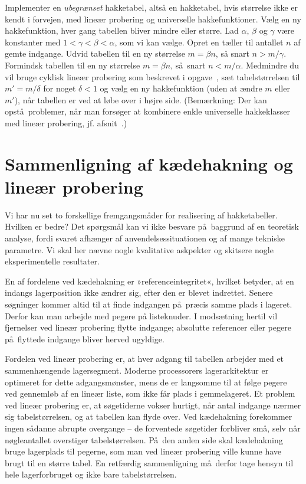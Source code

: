 \begin{exerc}
  Implementer en \emph{ubegrænset} hakketabel, altså en hakketabel, hvis størrelse ikke er kendt i forvejen, med lineær probering og universelle hakkefunktioner.
  Vælg en ny hakkefunktion, hver gang tabellen bliver mindre eller større.
  Lad $\alpha$, $\beta$ og $\gamma$ være konstanter med $1<\gamma<\beta<\alpha$, som vi kan vælge.
  Opret en tæller til antallet $n$ af gemte indgange.
  Udvid tabellen til en ny størrelse $m=\beta n$, så snart $n>m/\gamma$.
  Formindsk tabellen til en ny størrelse $m=\beta n$, så snart $n<m/\alpha$.
  Medmindre du vil bruge cyklisk lineær probering som beskrevet i opgave~, sæt tabelstørrelsen til $m'=m/\delta$ for noget $\delta<1$ og vælg en ny hakkefunktion (uden at ændre $m$ eller $m'$), når tabellen er ved at løbe over i højre side.
  (Bemærkning: Der kan opstå problemer, når man forsøger at kombinere enkle universelle hakkeklasser med lineær probering, jf. afsnit~.)
\end{exerc}

\section{Sammenligning af kædehakning og lineær probering}
%
Vi har nu set to forskellige fremgangsmåder for realisering af hakketabeller.
Hvilken er bedre?
Det spørgsmål kan vi ikke besvare på baggrund af en teoretisk analyse, fordi svaret afhænger af anvendelsessituationen og af mange tekniske parametre.
Vi skal her nævne nogle kvalitative askpekter og skitsere nogle eksperimentelle resultater.

En af fordelene ved kædehakning er »referenceintegritet«,
hvilket betyder, at en indangs lagerposition ikke ændrer sig, efter den er blevet indrettet.
Senere søgninger kommer altid til at finde indgangen på præcis samme plads i lageret.
Derfor kan man arbejde med pegere på listeknuder.
I modsætning hertil vil fjernelser ved lineær probering flytte indgange; absolutte referencer eller pegere på flyttede indgange bliver herved ugyldige.

Fordelen ved lineær probering er, at hver adgang til tabellen arbejder med et sammenhængende lagersegment.
Moderne processorers lagerarkitektur er optimeret for dette adgangsmønster, mens de er langsomme til at følge pegere ved gennemløb af en lineær liste, som ikke får plads i gemmelageret.
Et problem ved lineær probering er, at søgetiderne vokser hurtigt, når antal indgange nærmer sig tabelstørrelsen, og at tabellen kan flyde over.
Ved kædehakning forekommer ingen sådanne abrupte overgange -- de forventede søgetider forbliver små, selv når nøgleantallet overstiger tabelstørrelsen.
På den anden side skal kædehakning bruge lagerplads til pegerne, som man ved lineær probering ville kunne have brugt til en større tabel.
En retfærdig sammenligning må derfor tage hensyn til hele lagerforbruget og ikke bare tabelstørrelsen.

